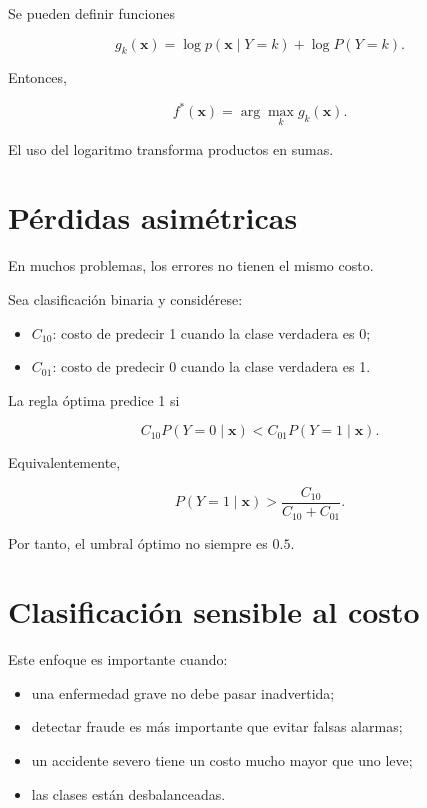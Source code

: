 \documentclass[
  spanish,
  10.5pt,
  letterpaper,
  DIV=11,
  numbers=noendperiod,
  oneside,
  open=any]{scrreprt}
\providecommand{\tightlist}{%
  \setlength{\itemsep}{0pt}\setlength{\parskip}{0pt}}
\theoremstyle{definition}
\theoremstyle{definition}
\theoremstyle{plain}
\theoremstyle{remark}
\begin{document}

Se pueden definir funciones

\[
g_k(\mathbf{x})
=
\log p(\mathbf{x}\mid Y=k)
+
\log P(Y=k).
\]

Entonces,

\[
f^{*}(\mathbf{x})
=
\arg\max_k
g_k(\mathbf{x}).
\]

El uso del logaritmo transforma productos en sumas.

\section*{Pérdidas asimétricas}\label{puxe9rdidas-asimuxe9tricas}


En muchos problemas, los errores no tienen el mismo costo.

Sea clasificación binaria y considérese:

\begin{itemize}
\tightlist
\item
  \(C_{10}\): costo de predecir 1 cuando la clase verdadera es 0;
\item
  \(C_{01}\): costo de predecir 0 cuando la clase verdadera es 1.
\end{itemize}

La regla óptima predice 1 si

\[
C_{10}P(Y=0\mid\mathbf{x})
<
C_{01}P(Y=1\mid\mathbf{x}).
\]

Equivalentemente,

\[
P(Y=1\mid\mathbf{x})
>
\frac{
C_{10}
}{
C_{10}+C_{01}
}.
\]

Por tanto, el umbral óptimo no siempre es \(0.5\).

\section*{Clasificación sensible al
costo}\label{clasificaciuxf3n-sensible-al-costo}


Este enfoque es importante cuando:

\begin{itemize}
\tightlist
\item
  una enfermedad grave no debe pasar inadvertida;
\item
  detectar fraude es más importante que evitar falsas alarmas;
\item
  un accidente severo tiene un costo mucho mayor que uno leve;
\item
  las clases están desbalanceadas.
\end{itemize}
\end{document}
